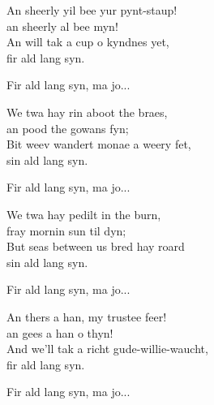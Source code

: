 An sheerly yil bee yur pynt-staup!\\
an sheerly al bee myn!\\
An will tak a cup o kyndnes yet,\\
fir ald lang syn.\par
\vspace{9pt}
Fir ald lang syn, ma jo...\par
\vspace{9pt}
We twa hay rin aboot the braes,\\
an pood the gowans fyn;\\
Bit weev wandert monae a weery fet,\\
sin ald lang syn.\par
\vspace{9pt}
Fir ald lang syn, ma jo...\par
\vspace{9pt}
We twa hay pedilt in the burn,\\
fray mornin sun til dyn;\\
But seas between us bred hay roard\\
sin ald lang syn.\par
\newpage
Fir ald lang syn, ma jo...\par
\vspace{10pt}
An thers a han, my trustee feer!\\
an gees a han o thyn!\\
And we'll tak a richt gude-willie-waucht,\\
fir ald lang syn.\par
\vspace{10pt}
Fir ald lang syn, ma jo...
